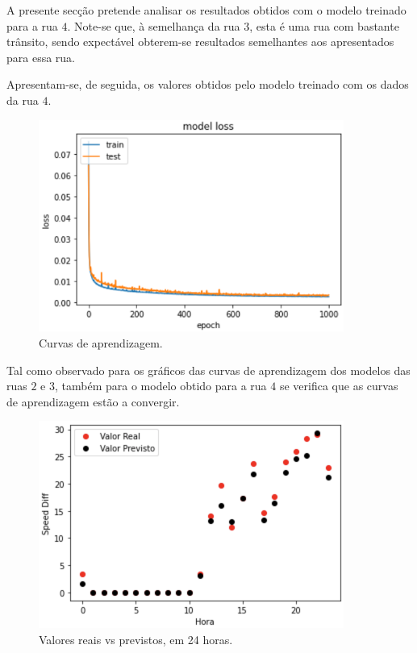 \documentclass[a4paper, 12pt]{article}
\begin{document}
A presente secção pretende analisar os resultados obtidos com o modelo treinado para a rua $4$. Note-se que, à semelhança da rua $3$, esta é uma rua com bastante trânsito, sendo expectável obterem-se resultados semelhantes aos apresentados para essa rua.

Apresentam-se, de seguida, os valores obtidos pelo modelo treinado com os dados da rua $4$. 

\begin{figure}[H]
	\centering
	\includegraphics[width=10cm]{resultados/curvas_aprend_4.png}
	\caption{Curvas de aprendizagem.}
\end{figure}

Tal como observado para os gráficos das curvas de aprendizagem dos modelos das ruas $2$ e $3$, também para o modelo obtido para a rua $4$ se verifica que as curvas de aprendizagem estão a convergir.

\begin{figure}[H]
	\centering
	\includegraphics[width=10cm]{resultados/real_prev_4.png}
	\caption{Valores reais vs previstos, em 24 horas.}
\end{figure}
\end{document}
